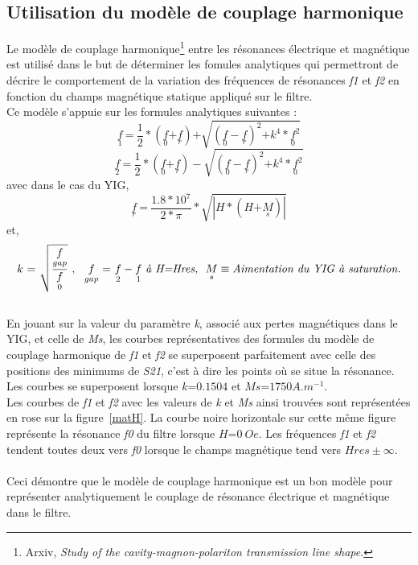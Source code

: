\documentclass[12pt,fleqn]{book} %
\begin{document}
\subsection{Utilisation du modèle de couplage harmonique}
\noindent Le modèle de couplage harmonique\footnote{Arxiv, \emph{Study of the cavity-magnon-polariton transmission line shape}.} entre les résonances électrique et magnétique est utilisé dans le but de déterminer les fomules analytiques qui permettront de décrire le comportement de la variation des fréquences de résonances \emph{f1} et \emph{f2} en fonction du champs magnétique statique appliqué sur le filtre. 
~\\Ce modèle s'appuie sur les formules analytiques suivantes :
$$\underset{1}{f}\ \text{=}\ \frac{1}{2}*(\underset{0}{f}\text{+}\underset{r}{f})\text{+}\sqrt{(\underset{0}{f}-\underset{r}{f})^{2}\text{+}k^4*\underset{0}{f}^2}$$
$$\underset{2}{f}\ \text{=}\ \frac{1}{2}*(\underset{0}{f}\text{+}\underset{r}{f})-\sqrt{(\underset{0}{f}-\underset{r}{f})^{2}\text{+}k^4*\underset{0}{f}^2}$$
avec dans le cas du YIG,
$$\underset{r}{f}\ \text{=}\ \frac{1.8*10^7}{2*\pi}*\sqrt{|H*(H\text{+}\underset{s}{M})|}$$
et,
$$k\ \text{=}\ \sqrt{\frac{\underset{gap}{f}}{\underset{0}{f}}}\ ,\ \ \underset{gap}{f}\ \text{=}\ \underset{2}{f}-\underset{1}{f}\ \text{\emph{à H=Hres,}}\ \ \underset{s}{M}\equiv\text{\emph{Aimentation du YIG à saturation.}}$$
~\\En jouant sur la valeur du paramètre \emph{k}, associé aux pertes magnétiques dans le YIG, et celle de \emph{Ms}, les courbes représentatives des formules du modèle de couplage harmonique
de \emph{f1} et \emph{f2} se superposent parfaitement avec celle des positions des minimums de \emph{S21}, c'est à dire les points où se situe la résonance. Les courbes se superposent lorsque $k\text{=}0.1504$ et $Ms\text{=}1750 A.m^{-1}$.
~\\Les courbes de \emph{f1} et \emph{f2} avec les valeurs de \emph{k} et \emph{Ms} ainsi trouvées sont représentées en rose sur la figure~\underline{\color{blue}\ref{matH}}.
La courbe noire horizontale sur cette même figure représente la résonance \emph{f0} du filtre lorsque $H\text{=}0\ Oe$. Les fréquences \emph{f1} et \emph{f2} tendent toutes deux vers \emph{f0} lorsque le champs magnétique tend vers $Hres\pm\infty$.  
~\\\\Ceci démontre que le modèle de couplage harmonique est un bon modèle pour représenter analytiquement le couplage de résonance électrique et magnétique dans le filtre.
\end{document}
